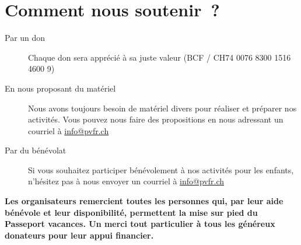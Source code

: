 \section*{Comment nous soutenir ?}

\begin{description}
	\item [Par un don]
	Chaque don sera apprécié à sa juste valeur (BCF / CH74 0076 8300 1516 4600 9)
	\item [En nous proposant du matériel]
	Nous avons toujours besoin de matériel divers pour réaliser et préparer
	nos activités. Vous pouvez nous faire des propositions en nous adressant
	un courriel à \url{info@pvfr.ch}
	\item [Par du bénévolat]
	Si vous souhaitez participer bénévolement à nos activités pour les
	enfants, n’hésitez pas à nous envoyer un courriel à \url{info@pvfr.ch}
\end{description}

\textbf{Les organisateurs remercient toutes les personnes qui, par leur aide bénévole et leur disponibilité, permettent
la mise sur pied du Passeport vacances. Un merci tout particulier à tous les généreux donateurs pour leur appui financier.
}

